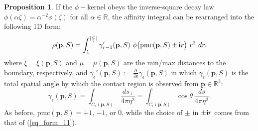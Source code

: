 \documentclass[article]{gmp2014}
\theoremstyle{definition}
\newtheorem{prop}{\textsf{\textbf{{Proposition}}}}
\newcommand{\ii}{\text{\textsf{\textbf{i}}}}
\begin{document}
%
\begin{prop}
    If the $\phi-$kernel obeys the inverse-square decay law $\phi(\alpha \zeta) = \alpha^{-2} \phi(\zeta)$ for all $\alpha \in \mathds{R}$, the affinity integral can be rearranged into the following 1D form:
    \begin{equation}
        \rho(\mathbf{p}, S) = \int_1^{|\frac{\mu}{\xi}|} \gamma_{r-1}'(\mathbf{p}, S) ~ \phi \big( \mathrm{pmc}(\mathbf{p}, S) \pm \ii r \big) ~r^2 ~ dr, \label{eq_form_17A}
    \end{equation}
    where $\xi = \xi(\mathbf{p}, S)$ and $\mu = \mu(\mathbf{p}, S)$ are the min/max distances to the boundary, respectively, and $\gamma_\epsilon'(\mathbf{p}, S) := \frac{\partial~}{\partial \epsilon}\gamma_\epsilon(\mathbf{p}, S)$ in which $\gamma_\epsilon(\mathbf{p}, S)$ is the total spatial angle by which the contact region is observed from $\mathbf{p} \in \mathds{R}^3$:
    \begin{equation}
        \gamma_\epsilon(\mathbf{p}, S) = \int_{C_\epsilon(\mathbf{p}, S)} ~\frac{d s_\bot}{4\pi \eta^2} = \int_{C_\epsilon(\mathbf{p}, S)} \cos \theta ~\frac{d s}{4\pi \eta^2}.
    \end{equation}
    As before, $\mathrm{pmc}(\mathbf{p}, S) = +1$, $-1$, or $0$, while the choice of $\pm$ in $\pm \ii r$ comes from that of (\ref{eq_form_11}).
\end{prop}
%
\end{document}
